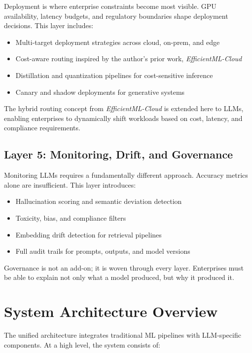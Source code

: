 \documentclass[11pt]{article}
\begin{document}
Deployment is where enterprise constraints become most visible. GPU availability, latency budgets, and regulatory boundaries shape deployment decisions. This layer includes:

\begin{itemize}[leftmargin=1.2cm]
    \item Multi-target deployment strategies across cloud, on-prem, and edge
    \item Cost-aware routing inspired by the author's prior work, \textit{EfficientML-Cloud}
    \item Distillation and quantization pipelines for cost-sensitive inference
    \item Canary and shadow deployments for generative systems
\end{itemize}

The hybrid routing concept from \textit{EfficientML-Cloud} is extended here to LLMs, enabling enterprises to dynamically shift workloads based on cost, latency, and compliance requirements.

\subsection{Layer 5: Monitoring, Drift, and Governance}

Monitoring LLMs requires a fundamentally different approach. Accuracy metrics alone are insufficient. This layer introduces:

\begin{itemize}[leftmargin=1.2cm]
    \item Hallucination scoring and semantic deviation detection
    \item Toxicity, bias, and compliance filters
    \item Embedding drift detection for retrieval pipelines
    \item Full audit trails for prompts, outputs, and model versions
\end{itemize}

Governance is not an add-on; it is woven through every layer. Enterprises must be able to explain not only what a model produced, but why it produced it.

\section{System Architecture Overview}

The unified architecture integrates traditional ML pipelines with LLM-specific components. At a high level, the system consists of:
\end{document}
